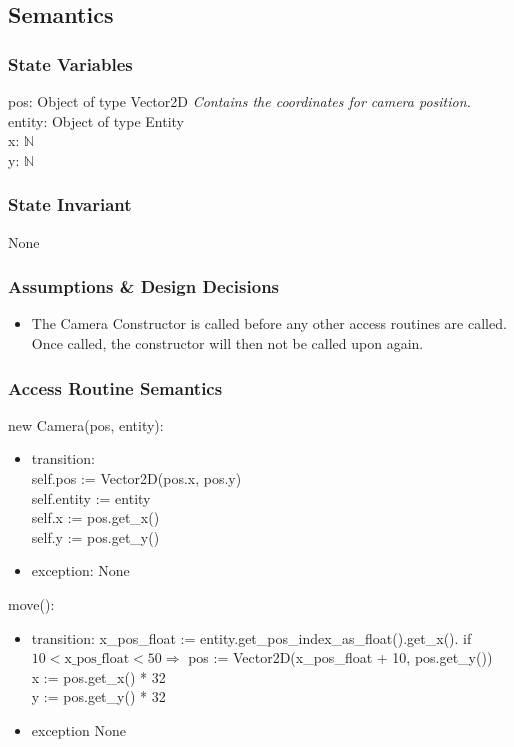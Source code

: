 \documentclass[12pt]{article}
\begin{document}
\subsection*{Semantics}
\subsubsection*{State Variables}
pos: Object of type Vector2D \emph{Contains the coordinates for camera position.}\\ 
entity: Object of type Entity\\
x: $\mathbb{N}$\\ 
y: $\mathbb{N}$\\

\subsubsection*{State Invariant}
None
\subsubsection*{Assumptions \& Design Decisions}
\begin{itemize}
    \item The Camera Constructor is called before any other access routines are called. Once called, the constructor will then not be called upon again.
\end{itemize}

\subsubsection*{Access Routine Semantics}

new Camera(pos, entity):
\begin{itemize}
    \item transition: \\self.pos := Vector2D(pos.x, pos.y)\\
                      self.entity := entity\\
                      self.x := pos.get\_x()\\
                      self.y := pos.get\_y()\\
    \item exception: None
\end{itemize}

move():
\begin{itemize}
    \item transition: x\_pos\_float := entity.get\_pos\_index\_as\_float().get\_x(). if $10 < \text{x\_pos\_float} < 50 \Rightarrow$ pos := Vector2D(x\_pos\_float + 10, pos.get\_y())\\
    x := pos.get\_x() * 32\\
    y := pos.get\_y() * 32
    \item exception None
\end{itemize}
\end{document}
